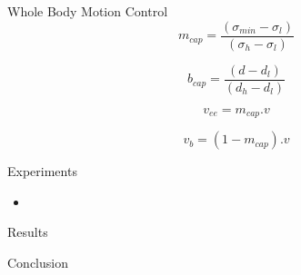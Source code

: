 \documentclass{beamer}
\begin{document}
	\begin{frame}{Whole Body Motion Control}
		\begin{equation}
		m_{cap} = \frac{(\sigma_{min} - \sigma_{l})}{(\sigma_{h} - \sigma_{l})}
		\end{equation}

		\begin{equation}
		b_{cap} = \frac{(d - d_{l})}{(d_{h} - d_{l})}
		\end{equation}
		
		\begin{equation}
		v_{ee} = m_{cap}.v
		\end{equation} 
		
		\begin{equation}
		v_{b} = (1 - m_{cap}).v
		\end{equation} 

	\end{frame}
	
	\begin{frame}{Experiments}
		\begin{itemize}
			\item 
		\end{itemize}
	\end{frame}
	
	\begin{frame}{Results}
	
	\end{frame}
	
	\begin{frame}{Conclusion}
	
	\end{frame}
\end{document}

